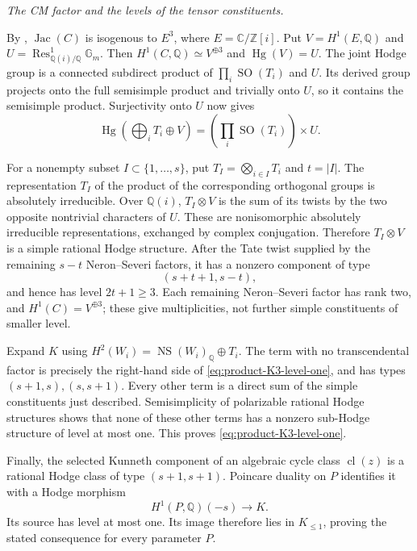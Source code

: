 \emph{The CM factor and the levels of the tensor constituents.}\par
By \citet[Lemma~2, p.~106, and Example~3, pp.~106--107]
{frBeauville2014}, $\operatorname{Jac}(C)$ is isogenous to $E^3$,
where $E=\mathbb C/\mathbb Z[i]$. Put $V=H^1(E,\mathbb Q)$ and
$U=\operatorname{Res}^1_{\mathbb Q(i)/\mathbb Q}\mathbb G_m$.
Then $H^1(C,\mathbb Q)\simeq V^{\oplus3}$ and
$\operatorname{Hg}(V)=U$. The joint Hodge group is a connected
subdirect product of $\prod_i\operatorname{SO}(T_i)$ and $U$.
Its derived group projects onto the full semisimple product and
trivially onto $U$, so it contains the semisimple product. Surjectivity
onto $U$ now gives
\[
 \operatorname{Hg}\left(\bigoplus_iT_i\oplus V\right)
             =\left(\prod_i\operatorname{SO}(T_i)\right)\times U.
\]

For a nonempty subset $I\subset\{1,\ldots,s\}$, put
$T_I=\bigotimes_{i\in I}T_i$ and $t=|I|$.
The representation $T_I$ of the product of the corresponding
orthogonal groups is absolutely irreducible. Over $\mathbb Q(i)$,
$T_I\otimes V$ is the sum of its twists by the two opposite
nontrivial characters of $U$. These are nonisomorphic absolutely
irreducible representations, exchanged by complex conjugation.
Therefore $T_I\otimes V$ is a simple rational Hodge structure.
After the Tate twist supplied by the remaining $s-t$ Neron--Severi
factors, it has a nonzero component of type
\[
                       (s+t+1,s-t),
\]
and hence has level $2t+1\geq3$. Each remaining Neron--Severi
factor has rank two, and $H^1(C)=V^{\oplus3}$; these give
multiplicities, not further simple constituents of smaller level.

Expand $K$ using $H^2(W_i)=\operatorname{NS}(W_i)_{\mathbb Q}\oplus T_i$.
The term with no transcendental factor is precisely the right-hand
side of \eqref{eq:product-K3-level-one}, and has types
$(s+1,s),(s,s+1)$. Every other term is a direct sum of the simple
constituents just described. Semisimplicity of polarizable rational
Hodge structures shows that none of these other terms has a nonzero
sub-Hodge structure of level at most one. This proves
\eqref{eq:product-K3-level-one}.

Finally, the selected Kunneth component of an algebraic cycle class
$\operatorname{cl}(z)$ is a rational Hodge class of type $(s+1,s+1)$.
Poincare duality on $P$ identifies it with a Hodge morphism
\[
                 H^1(P,\mathbb Q)(-s)\longrightarrow K.
\]
Its source has level at most one. Its image therefore lies in
$K_{\leq1}$, proving the stated consequence for every parameter $P$.

